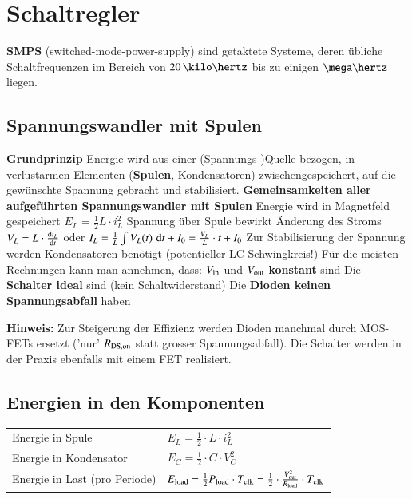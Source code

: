 \section{Schaltregler}

\textbf{SMPS} (switched-mode-power-supply) sind getaktete Systeme, deren übliche Schaltfrequenzen im Bereich von 
$20 \, \kilo \hertz$ bis zu einigen $\mega \hertz$ liegen.


\subsection{Spannungswandler mit Spulen}

\begin{outline} %
    \1 \textbf{Grundprinzip}
        \2 Energie wird aus einer (Spannungs-)Quelle bezogen, in verlustarmen Elementen (\textbf{Spulen}, Kondensatoren) 
            zwischengespeichert, auf die gewünschte Spannung gebracht und stabilisiert.
    \1 \textbf{Gemeinsamkeiten aller aufgeführten Spannungswandler mit Spulen}
        \2 Energie wird in Magnetfeld gespeichert $E_L = \frac{1}{2} L \cdot i_L^2$
        \2 Spannung über Spule bewirkt Änderung des Stroms \\
            $V_L = L \cdot \frac{\mathop{} \! \mathrm{d} i_L}{\mathop{} \! \mathrm{d} t}$ oder $I_L= \frac{1}{L} \int V_L(t) \, \mathop{} \! \mathrm{d} t + I_0  = \frac{V_L}{L} \cdot t + I_0$ 
        \2 Zur Stabilisierung der Spannung werden Kondensatoren benötigt (potentieller LC-Schwingkreis!)
        \2 Für die meisten Rechnungen kann man annehmen, dass:
            \3 $V_{\rm in}$ und $V_{\rm out}$ \textbf{konstant} sind
            \3 Die \textbf{Schalter ideal} sind (kein Schaltwiderstand)
            \3 Die \textbf{Dioden keinen Spannungsabfall} haben
\end{outline}

\textbf{Hinweis:} Zur Steigerung der Effizienz werden Dioden manchmal durch MOS-FETs ersetzt ('nur' $R_{\rm DS,on}$ statt grosser
Spannungsabfall). Die Schalter werden in der Praxis ebenfalls mit einem FET realisiert.

\subsection{Energien in den Komponenten}

\renewcommand{\arraystretch}{1.2}
\begin{tabular}{ll}
    Energie in Spule                & $E_L = \frac{1}{2} \cdot L \cdot i_L^2$ \\
    Energie in Kondensator          & $E_C = \frac{1}{2} \cdot C \cdot V_C^2$ \\
    Energie in Last (pro Periode)   & $E_{\rm load} = \frac{1}{2} P_{\rm load} \cdot T_{\rm clk} = \frac{1}{2} \cdot \frac{V_{\rm out}^2}{R_{\rm load}} \cdot T_{\rm clk}$
\end{tabular}
\renewcommand{\arraystretch}{1}


